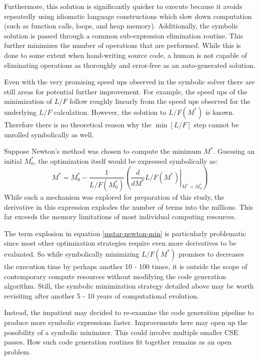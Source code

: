 \documentclass{ansconf}
\begin{document}
Furthermore, this solution is significantly quicker to execute because it avoids
repeatedly using idiomatic language constructions which slow down computation (such
as function calls, loops, and heap memory).  Additionally, the symbolic solution is
passed through a common sub-expression elimination routine.  This further minimizes
the number of operations that are performed.  While this is done to some extent when 
hand-writing source code, a human is not capable of eliminating operations as 
thoroughly and error-free as an auto-generated solution.

Even with the very promising speed ups observed in the symbolic solver there are 
still areas for potential further improvement.  For example, the speed ups of the 
minimization of $L/F$ follow roughly linearly from the speed ups observed for the
underlying $L/F$ calculation.  However, the solution to $L/F(M^*)$ is known.
Therefore there is no theoretical reason why the $\min\left[L/F\right]$ step 
cannot be unrolled symbolically as well.

Suppose Newton's method was chosen to compute the minimum $M^*$.  Guessing 
an initial $M_0^*$, the optimization itself would be expressed symbolically as:
\begin{equation}
M^* = M_0^* - \frac{1}{L/F(M_0^*)}\left(\left.\frac{d}{dM^*}L/F(M^*)\right|_{M^*=M_0^*}\right)
\label{mstar-newton-min}
\end{equation}
While such a mechanism was explored for preparation of this study, the derivative
in this expression explodes the number of terms into the millions.  This far exceeds
the memory limitations of most individual computing resources.  

The term explosion in equation \ref{mstar-newton-min} is particularly problematic 
since most other optimization strategies require
even more derivatives to be evaluated.  So while symbolically minimizing $L/F(M^*)$
 promises
to decreases the execution time by perhaps another 10 - 100 times, it is 
outside the scope of contemporary compute resources without modifying the 
code generation algorithm.  Still, the symbolic minimization strategy detailed above
may be worth revisiting after another 5 - 10 years of computational evolution.

Instead, the impatient may decided to re-examine the code generation pipeline to 
produce more symbolic expressions faster.  Improvements here may open up the 
possibility of
a symbolic minimizer.  This could involve multiple smaller CSE passes.  How 
such code generation routines fit together remains as an open problem.
\end{document}
